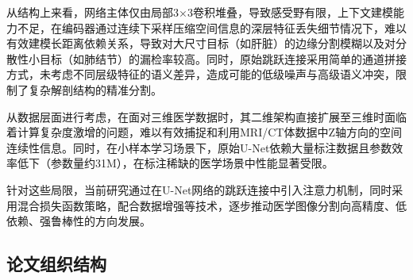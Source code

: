 从结构上来看，网络主体仅由局部3×3卷积堆叠，导致感受野有限，上下文建模能力不足，在编码器通过连续下采样压缩空间信息的深层特征丢失细节情况下，难以有效建模长距离依赖关系，导致对大尺寸目标（如肝脏）的边缘分割模糊以及对分散性小目标（如肺结节）的漏检率较高。同时，原始跳跃连接采用简单的通道拼接方式，未考虑不同层级特征的语义差异，造成可能的低级噪声与高级语义冲突，限制了复杂解剖结构的精准分割\cite{zhou2020}。

从数据层面进行考虑，在面对三维医学数据时，其二维架构直接扩展至三维时面临着计算复杂度激增的问题，难以有效捕捉和利用MRI/CT体数据中Z轴方向的空间连续性信息。同时，在小样本学习场景下，原始U-Net依赖大量标注数据且参数效率低下（参数量约31M），在标注稀缺的医学场景中性能显著受限。

针对这些局限，当前研究通过在U-Net网络的跳跃连接中引入注意力机制，同时采用混合损失函数策略，配合数据增强等技术，逐步推动医学图像分割向高精度、低依赖、强鲁棒性的方向发展。

\subsection{论文组织结构}
